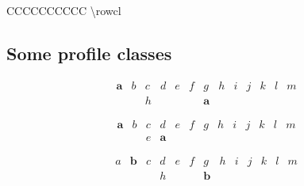 \documentclass[version=3.21, pagesize, twoside=off, bibliography=totoc, DIV=calc, fontsize=12pt, a4paper]{scrartcl}
\begin{document}
\begin{table}
\begin{tabular}{CCCCCCCCCC}
{			\FPsub\rowdeltamin{\rowminlPy}{\rowminlPx}%
			\FPsub{}%
			\FPsub{}%
			\FPmul\rowtakendouble{\rowdeltaminminusone}{\rowdeltaminminustwo}%
			\FPdiv{}%
			\FPadd{}%
			\FPsub\rowdeltamax{\rowmaxlPy}{\rowmaxlPx}%
			\FPsub{}%
			\FPadd\rowcltop{\rowstart}{\rowdeltamaxminusone}%
			\num{\rowcl}
		}\\
		\bottomrule
	\end{tabular}
	\caption{Possible values for $m = 13$; $v(z) = (\min \lprof(z), \max \lprof(z), \frac{\sum \lprof(z)}{2})$; top indicates whether $\min \lprof(x) = 0$}
	\label{fig:m13}
\end{table}

\subsection{Some profile classes}
\begin{example}[$\Delta^\text{min} = 2$; $\delta = 1$; $\lprof(x) = (0, 6)$ thus cl $1$]
	\begin{equation}
		\begin{array}{lllllllllllll}
			\bm{a}	& b	& c	& d	& e	& f	& g	& h	& i & j & k & l & m\\
			& & h & & & & \bm{a}
		\end{array}
	\end{equation}
\end{example}

\begin{example}[$\Delta^\text{min} = 2$; $\delta = 1$; $\lprof(x) = (0, 3)$ thus cl $1$]
	\begin{equation}
		\begin{array}{lllllllllllll}
			\bm{a}	& b	& c	& d	& e	& f	& g	& h	& i & j & k & l & m\\
			& & e & \bm{a}
		\end{array}
	\end{equation}
\end{example}

\begin{example}[$\Delta^\text{min} = 2$; $\delta = 1$; $\lprof(x) = (1, 6)$ thus cl $11$]
	\begin{equation}
		\begin{array}{lllllllllllll}
			a	& \bm{b}	& c	& d	& e	& f	& g	& h	& i & j & k & l & m\\
			& & & h & & & \bm{b}
		\end{array}
	\end{equation}
\end{example}
\end{document}

